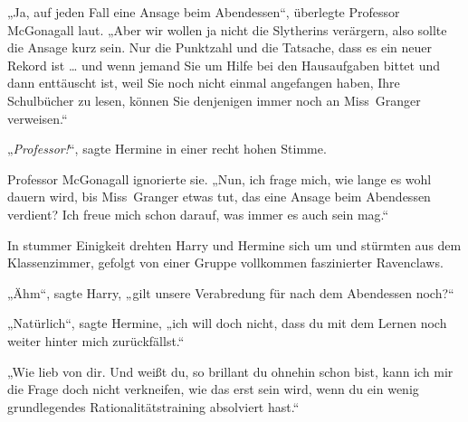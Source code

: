 „Ja, auf jeden Fall eine Ansage beim Abendessen“, überlegte Professor McGonagall laut.
„Aber wir wollen ja nicht die Slytherins verärgern, also sollte die Ansage kurz sein. Nur die Punktzahl und die Tatsache, dass es ein neuer Rekord ist … und wenn jemand Sie um Hilfe bei den Hausaufgaben bittet und dann enttäuscht ist, weil Sie noch nicht einmal angefangen haben, Ihre Schulbücher zu lesen, können Sie denjenigen immer noch an Miss~Granger verweisen.“

„\emph{Professor!}“, sagte Hermine in einer recht hohen Stimme.

Professor McGonagall ignorierte sie.
„Nun, ich frage mich, wie lange es wohl dauern wird, bis Miss~Granger etwas tut, das eine Ansage beim Abendessen verdient? Ich freue mich schon darauf, was immer es auch sein mag.“

In stummer Einigkeit drehten Harry und Hermine sich um und stürmten aus dem Klassenzimmer, gefolgt von einer Gruppe vollkommen faszinierter Ravenclaws.

„Ähm“, sagte Harry, „gilt unsere Verabredung für nach dem Abendessen noch?“

„Natürlich“, sagte Hermine, „ich will doch nicht, dass du mit dem Lernen noch weiter hinter mich zurückfällst.“

„Wie lieb von dir. Und weißt du, so brillant du ohnehin schon bist, kann ich mir die Frage doch nicht verkneifen, wie das erst sein wird, wenn du ein wenig grundlegendes Rationalitätstraining absolviert hast.“

